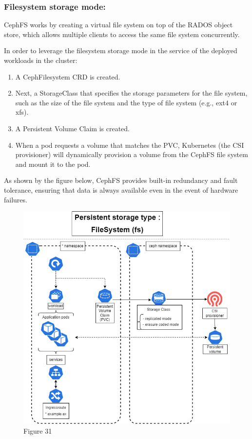 \subsubsection{Filesystem storage mode: }

CephFS works by creating a virtual file system on top of the RADOS object store, which allows multiple clients to access the same file system concurrently. 

In order to leverage the filesystem storage mode in the service of the deployed workloads in the cluster: 
\begin{enumerate}[label = (\arabic*)]
    \item A CephFilesystem CRD is created. 
    \item Next, a StorageClass that specifies the storage parameters for the file system, such as the size of the file system and the type of file system (e.g., ext4 or xfs). 
    \item A Persistent Volume Claim is created. 
    \item When a pod requests a volume that matches the PVC, Kubernetes (the CSI provisioner) will dynamically provision a volume from the CephFS file system and mount it to the pod. 
\end{enumerate}
As shown by the figure below, CephFS provides built-in redundancy and fault tolerance, ensuring that data is always available even in the event of hardware failures. 
\begin{figure}[H]\centering
\includegraphics[width=1.0\textwidth,angle=00]{assets/f31.png}
\caption{Figure 31 }
\label{fig:f31}
\end{figure}

